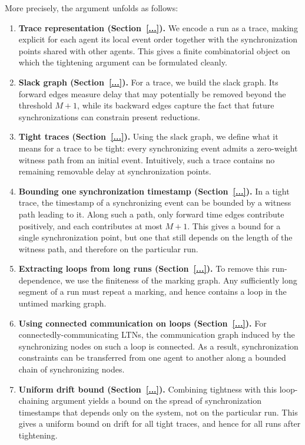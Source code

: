 More precisely, the argument unfolds as follows:
\begin{enumerate}
    \item \textbf{Trace representation (Section~\ref{...}).}
    We encode a run as a trace, making explicit for each agent its local event order
    together with the synchronization points shared with other agents. This gives a
    finite combinatorial object on which the tightening argument can be formulated
    cleanly.

    \item \textbf{Slack graph (Section~\ref{...}).}
    For a trace, we build the slack graph. Its forward edges measure delay that may
    potentially be removed beyond the threshold $M+1$, while its backward edges
    capture the fact that future synchronizations can constrain present reductions.

    \item \textbf{Tight traces (Section~\ref{...}).}
    Using the slack graph, we define what it means for a trace to be tight:
    every synchronizing event admits a zero-weight witness path from an initial
    event. Intuitively, such a trace contains no remaining removable delay at
    synchronization points.

    \item \textbf{Bounding one synchronization timestamp (Section~\ref{...}).}
    In a tight trace, the timestamp of a synchronizing event can be bounded by a
    witness path leading to it. Along such a path, only forward time edges contribute
    positively, and each contributes at most $M+1$. This gives a bound for a single
    synchronization point, but one that still depends on the length of the witness
    path, and therefore on the particular run.

    \item \textbf{Extracting loops from long runs (Section~\ref{...}).}
    To remove this run-dependence, we use the finiteness of the marking graph.
    Any sufficiently long segment of a run must repeat a marking, and hence
    contains a loop in the untimed marking graph.

    \item \textbf{Using connected communication on loops (Section~\ref{...}).}
    For connectedly-communicating LTNs, the communication graph induced by the
    synchronizing nodes on such a loop is connected. As a result, synchronization
    constraints can be transferred from one agent to another along a bounded chain
    of synchronizing nodes.

    \item \textbf{Uniform drift bound (Section~\ref{...}).}
    Combining tightness with this loop-chaining argument yields a bound on the
    spread of synchronization timestamps that depends only on the system, not on
    the particular run. This gives a uniform bound on drift for all tight traces, and
    hence for all runs after tightening.
\end{enumerate}

